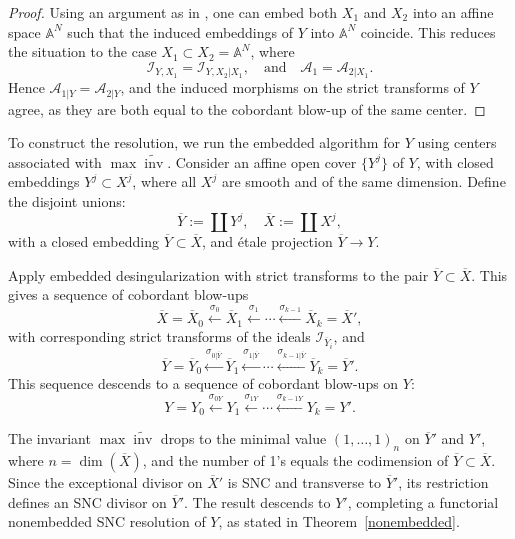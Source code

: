 \documentclass{amsart}
\newcommand{\inv}{{\operatorname{inv}}}
\begin{document}
\begin{proof}
Using an argument as in \cite[Lemma 2.5.3]{Wlodarczyk}, one can embed both \( X_1 \) and \( X_2 \) into an affine space \( \mathbb{A}^N \) such that the induced embeddings of \( Y \) into \( \mathbb{A}^N \) coincide. This reduces the situation to the case \( X_1 \subset X_2 = \mathbb{A}^N \), where
\[
\mathcal{I}_{Y,X_1} = \mathcal{I}_{Y,X_2|X_1}, \quad \text{and} \quad \mathcal{A}_1 = \mathcal{A}_{2|X_1}.
\]
Hence \( \mathcal{A}_{1|Y} = \mathcal{A}_{2|Y} \), and the induced morphisms on the strict transforms of \( Y \) agree, as they are both equal to the cobordant blow-up of the same center.
\end{proof}

To construct the resolution, we run the embedded algorithm for \( Y \) using centers associated with \( \max \widetilde{\inv} \). Consider an affine open cover \( \{Y^j\} \) of \( Y \), with closed embeddings \( Y^j \subset X^j \), where all \( X^j \) are smooth and of the same dimension. Define the disjoint unions:
\[
\overline{Y} := \coprod Y^j, \quad \overline{X} := \coprod X^j,
\]
with a closed embedding \( \overline{Y} \subset \overline{X} \), and \'etale projection \( \overline{Y} \to Y \).

Apply embedded desingularization with strict transforms to the pair \( \overline{Y} \subset \overline{X} \). This gives a sequence of cobordant blow-ups
\[
\overline{X} = \overline{X}_0 \xleftarrow{\sigma_0} \overline{X}_1 \xleftarrow{\sigma_1} \cdots \xleftarrow{\sigma_{k-1}} \overline{X}_k = \overline{X}',
\]
with corresponding strict transforms of the ideals \( \mathcal{I}_{\overline{Y}_i} \), and
\[
\overline{Y} = \overline{Y}_0 \xleftarrow{\sigma_{0|\overline{Y}}} \overline{Y}_1 \xleftarrow{\sigma_{1|\overline{Y}}} \cdots \xleftarrow{\sigma_{k-1|\overline{Y}}} \overline{Y}_k = \overline{Y}'.
\]
This sequence descends to a sequence of cobordant blow-ups on \( Y \):
\[
Y = Y_0 \xleftarrow{\sigma_{0Y}} Y_1 \xleftarrow{\sigma_{1Y}} \cdots \xleftarrow{\sigma_{k-1Y}} Y_k = Y'.
\]

The invariant \( \max \widetilde{\inv} \) drops to the minimal value \( (1, \ldots, 1)_n \) on \( \overline{Y}' \) and \( Y' \), where \( n = \dim(\overline{X}) \), and the number of 1's equals the codimension of \( \overline{Y} \subset \overline{X} \). Since the exceptional divisor on \( \overline{X}' \) is SNC and transverse to \( \overline{Y}' \), its restriction defines an SNC divisor on \( \overline{Y}' \). The result descends to \( Y' \), completing a functorial nonembedded SNC resolution of \( Y \), as stated in Theorem~\ref{nonembedded}.
\end{document}
